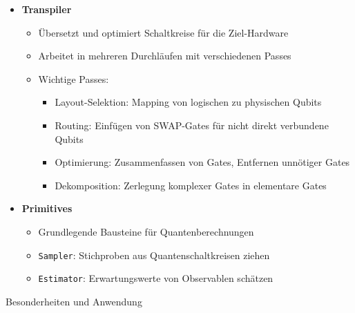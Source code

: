 \begin{itemize}
    \item \textbf{Transpiler}
    \begin{itemize}
        \item Übersetzt und optimiert Schaltkreise für die Ziel-Hardware
        \item Arbeitet in mehreren Durchläufen mit verschiedenen Passes
        \item Wichtige Passes:
        \begin{itemize}
            \item Layout-Selektion: Mapping von logischen zu physischen Qubits
            \item Routing: Einfügen von SWAP-Gates für nicht direkt verbundene Qubits
            \item Optimierung: Zusammenfassen von Gates, Entfernen unnötiger Gates
            \item Dekomposition: Zerlegung komplexer Gates in elementare Gates
        \end{itemize}
    \end{itemize}
    
    \item \textbf{Primitives}
    \begin{itemize}
        \item Grundlegende Bausteine für Quantenberechnungen
        \item \texttt{Sampler}: Stichproben aus Quantenschaltkreisen ziehen
        \item \texttt{Estimator}: Erwartungswerte von Observablen schätzen
    \end{itemize}
\end{itemize}

Besonderheiten und Anwendung

